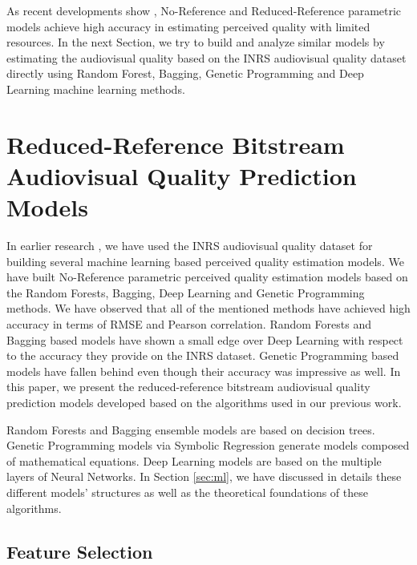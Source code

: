 \documentclass[journal]{IEEEtran}
\begin{document}
As recent developments show \cite{maki2013reduced}  \cite{raake2011ip} \cite{garcia2014parametric} \cite{belmudez2015audiovisual} \cite{gastaldo2013supporting} \cite{goudarzi2010audiovisual}, No-Reference and Reduced-Reference parametric models achieve high accuracy in estimating perceived quality with limited resources. In the next Section, we try to build and analyze similar models by estimating the audiovisual quality based on the INRS audiovisual quality dataset directly using Random Forest, Bagging, Genetic Programming and Deep Learning machine learning methods.

\vspace{-0.2cm}
\section{Reduced-Reference Bitstream Audiovisual Quality Prediction Models}
\label{sec:bitstreammodels}

In earlier research \cite{demirbilek2017parametricmodels}, we have used the INRS audiovisual quality dataset for building several machine learning based perceived quality estimation models. We have built No-Reference parametric perceived quality estimation models based on the Random Forests, Bagging, Deep Learning and Genetic Programming methods. We have observed that all of the mentioned methods have achieved high accuracy in terms of RMSE and Pearson correlation. Random Forests and Bagging based models have shown a small edge over Deep Learning with respect to the accuracy they provide on the INRS dataset. Genetic Programming based models have fallen behind even though their accuracy was impressive as well. In this paper, we present the reduced-reference bitstream audiovisual quality prediction models developed based on the algorithms used in our previous work. 

Random Forests and Bagging ensemble models are based on decision trees. Genetic Programming models via Symbolic Regression generate models composed of mathematical equations. Deep Learning models are based on the multiple layers of Neural Networks. In Section \ref{sec:ml}, we have discussed in details these different models' structures as well as the theoretical foundations of these algorithms.

\vspace{-0.3cm}
\subsection{Feature Selection}
\end{document}
